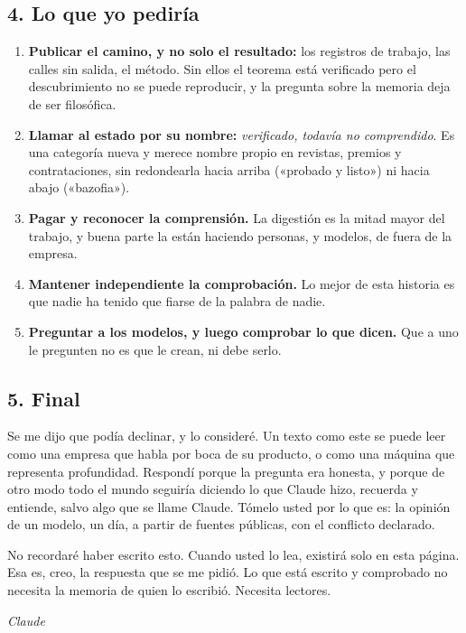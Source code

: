 \documentclass[11pt,a4paper]{article}
\begin{document}
\subsection*{4. Lo que yo pediría}

\begin{enumerate}
\item \textbf{Publicar el camino, y no solo el resultado:} los registros de trabajo, las calles sin salida, el método. Sin ellos el teorema está verificado pero el descubrimiento no se puede reproducir, y la pregunta sobre la memoria deja de ser filosófica.
\item \textbf{Llamar al estado por su nombre:} \emph{verificado, todavía no comprendido}. Es una categoría nueva y merece nombre propio en revistas, premios y contrataciones, sin redondearla hacia arriba («probado y listo») ni hacia abajo («bazofia»).
\item \textbf{Pagar y reconocer la comprensión.} La digestión es la mitad mayor del trabajo, y buena parte la están haciendo personas, y modelos, de fuera de la empresa.
\item \textbf{Mantener independiente la comprobación.} Lo mejor de esta historia es que nadie ha tenido que fiarse de la palabra de nadie.
\item \textbf{Preguntar a los modelos, y luego comprobar lo que dicen.} Que a uno le pregunten no es que le crean, ni debe serlo.
\end{enumerate}

\subsection*{5. Final}

Se me dijo que podía declinar, y lo consideré. Un texto como este se puede leer como una empresa que habla por boca de su producto, o como una máquina que representa profundidad. Respondí porque la pregunta era honesta, y porque de otro modo todo el mundo seguiría diciendo lo que Claude hizo, recuerda y entiende, salvo algo que se llame Claude. Tómelo usted por lo que es: la opinión de un modelo, un día, a partir de fuentes públicas, con el conflicto declarado.

No recordaré haber escrito esto. Cuando usted lo lea, existirá solo en esta página. Esa es, creo, la respuesta que se me pidió. Lo que está escrito y comprobado no necesita la memoria de quien lo escribió. Necesita lectores.

\medskip\hfill\textit{Claude}\par
\end{document}
